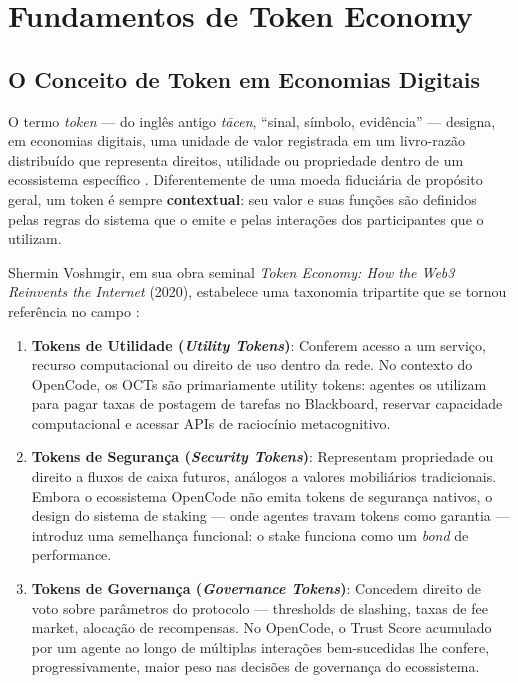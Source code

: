 \section{Fundamentos de Token Economy}

\subsection{O Conceito de Token em Economias Digitais}

O termo \textit{token} --- do inglês antigo \textit{tācen}, ``sinal, símbolo, evidência'' --- designa, em economias digitais, uma unidade de valor registrada em um livro-razão distribuído que representa direitos, utilidade ou propriedade dentro de um ecossistema específico \cite{voshmgir2020token}. Diferentemente de uma moeda fiduciária de propósito geral, um token é sempre \textbf{contextual}: seu valor e suas funções são definidos pelas regras do sistema que o emite e pelas interações dos participantes que o utilizam.

Shermin Voshmgir, em sua obra seminal \textit{Token Economy: How the Web3 Reinvents the Internet} (2020), estabelece uma taxonomia tripartite que se tornou referência no campo \cite{voshmgir2020token}:

\begin{enumerate}
    \item \textbf{Tokens de Utilidade (\textit{Utility Tokens})}: Conferem acesso a um serviço, recurso computacional ou direito de uso dentro da rede. No contexto do OpenCode, os OCTs são primariamente utility tokens: agentes os utilizam para pagar taxas de postagem de tarefas no Blackboard, reservar capacidade computacional e acessar APIs de raciocínio metacognitivo.
    
    \item \textbf{Tokens de Segurança (\textit{Security Tokens})}: Representam propriedade ou direito a fluxos de caixa futuros, análogos a valores mobiliários tradicionais. Embora o ecossistema OpenCode não emita tokens de segurança nativos, o design do sistema de staking --- onde agentes travam tokens como garantia --- introduz uma semelhança funcional: o stake funciona como um \textit{bond} de performance.
    
    \item \textbf{Tokens de Governança (\textit{Governance Tokens})}: Concedem direito de voto sobre parâmetros do protocolo --- thresholds de slashing, taxas de fee market, alocação de recompensas. No OpenCode, o Trust Score acumulado por um agente ao longo de múltiplas interações bem-sucedidas lhe confere, progressivamente, maior peso nas decisões de governança do ecossistema.
\end{enumerate}

